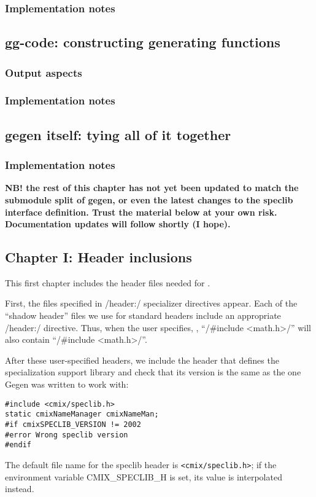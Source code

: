 \begin{docpart}
\subsubsection{Implementation notes}

\subsection{gg-code: constructing generating functions}

\subsubsection{Output aspects}

\subsubsection{Implementation notes}

\subsection{gegen itself: tying all of it together}

\subsubsection{Implementation notes}

\textbf{\Large NB! the rest of this chapter has not yet been updated to match
the submodule split of gegen, or even the latest changes to the
speclib interface definition. Trust the material below at your own
risk. Documentation updates will follow shortly (I hope).}

\subsection{Chapter I: Header inclusions}
\label{sec:gegen:HeaderInclusions}
This first chapter includes the header files needed for \Pgen.

First, the files specified in /header:/ specializer directives
appear. Each of the ``shadow header'' files we use for standard
headers include an appropriate /header:/ directive. Thus, when the
user specifies, \eg, ``/#include <math.h>/'' \Pgen will also contain
``/#include <math.h>/''.

After these user-specified headers, we include the header that defines
the specialization support library and check that its version is the
same as the one Gegen was written to work with:
\begin{verbatim}
#include <cmix/speclib.h>
static cmixNameManager cmixNameMan;
#if cmixSPECLIB_VERSION != 2002
#error Wrong speclib version
#endif
\end{verbatim}
The default file name for the speclib header is
\verb|<cmix/speclib.h>|; if the environment variable CMIX_SPECLIB_H is
set, its value is interpolated instead.


\end{docpart}
